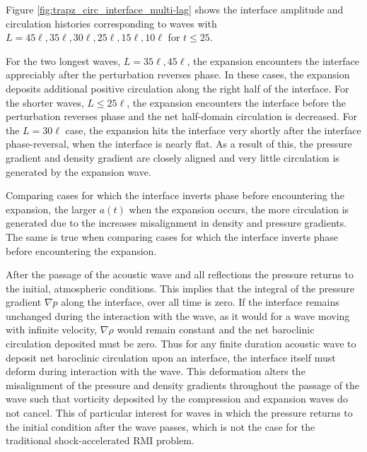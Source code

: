 Figure \ref{fig:trapz_circ_interface_multi-lag} shows the interface
amplitude and circulation histories corresponding to waves with
$L=45\ell, 35\ell ,30\ell ,25\ell ,15\ell ,10\ell$
for $t\leq 25$.

For the two longest waves, $L=35\ell, 45\ell$, the expansion
encounters the interface appreciably after the perturbation reverses
phase. In these cases, the expansion deposits additional positive
circulation along the right half of the interface. For the shorter
waves, $L \leq 25\ell$, the expansion encounters the interface
before the perturbation reverses phase and the net half-domain
circulation is decreased. For the $L=30\ell$ case, the expansion
hits the interface very shortly after the interface phase-reversal,
when the interface is nearly flat. As a result of this, the pressure
gradient and density gradient are closely aligned and very little
circulation is generated by the expansion wave.

Comparing cases for which the interface inverts phase before
encountering the expansion, the larger $a(t)$ when the expansion
occurs, the more circulation is generated due to the increases
misalignment in density and pressure gradients. The same is true when
comparing cases for which the interface inverts phase before
encountering the expansion.

After the passage of the acoustic wave and all reflections the
pressure returns to the initial, atmospheric conditions. This implies
that the integral of the pressure gradient $\nabla p$ along the
interface, over all time is zero. If the interface remains unchanged
during the interaction with the wave, as it would for a wave moving
with infinite velocity, $\nabla \rho$ would remain constant and the
net baroclinic circulation deposited must be zero. Thus for any finite
duration acoustic wave to deposit net baroclinic circulation upon an
interface, the interface itself must deform during interaction with
the wave. This deformation alters the misalignment of the pressure and
density gradients throughout the passage of the wave such that
vorticity deposited by the compression and expansion waves do not
cancel. This of particular interest for waves in which the pressure
returns to the initial condition after the wave passes, which is not
the case for the traditional shock-accelerated \ac{RMI} problem.


